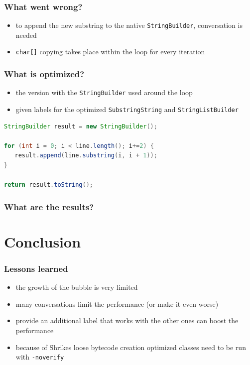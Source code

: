 \documentclass{beamer}
\begin{document}
\begin{frame}
   \frametitle{What went wrong?}
   \begin{itemize}
      \item to append the new substring to the native \texttt{StringBuilder}, conversation is needed
      \item \texttt{char[]} copying takes place within the loop for every iteration
   \end{itemize}
\end{frame}

\begin{frame}[fragile]
   \frametitle{What is optimized?}
   
   \begin{itemize}
      \item the version with the \texttt{StringBuilder} used around the loop
      \item given labels for the optimized \texttt{SubstringString} and \texttt{StringListBuilder}
   \end{itemize}

   \begin{lstlisting}[language=Java]
StringBuilder result = new StringBuilder();

for (int i = 0; i < line.length(); i+=2) {
   result.append(line.substring(i, i + 1));
}

return result.toString();
   \end{lstlisting}   

\end{frame}

\begin{frame}
  \frametitle{What are the results?}
  \begin{bchart}[step=500,max=1500]
      \smallskip
      \smallskip
  \end{bchart}
\end{frame}

\section{Conclusion}

\frame{\sectionpage}

\begin{frame}
	\frametitle{Lessons learned}
   \begin{itemize}
      \item the growth of the bubble is very limited
      \item many conversations limit the performance (or make it even worse)  
      \item provide an additional label that works with the other ones can boost the performance
      \item because of Shrikes loose bytecode creation optimized classes need to be run with \texttt{-noverify}

   \end{itemize}
\end{frame}
\end{document}
